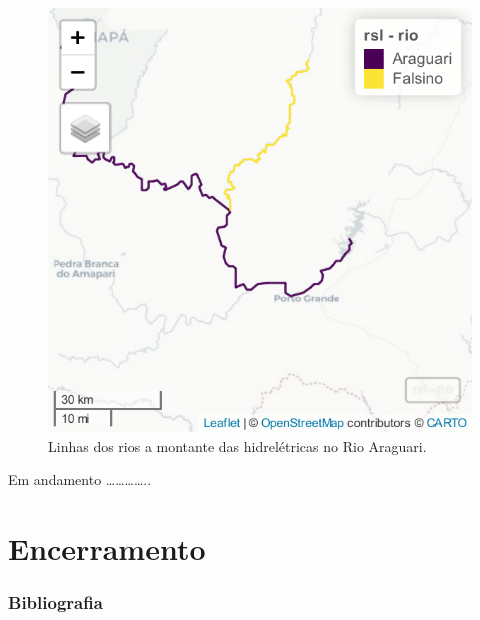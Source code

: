 \documentclass[
]{article}
\begin{document}
\begin{figure}
\centering
\includegraphics{epr_files/figure-latex/unnamed-chunk-258-1.pdf}
\caption{\label{fig:unnamed-chunk-258}Linhas dos rios a montante das hidrelétricas no Rio Araguari.}
\end{figure}

Em andamento \ldots\ldots\ldots\ldots..

\newpage{}

\newpage{}

\hypertarget{part-encerramento}{%
\part{Encerramento}\label{part-encerramento}}

\newpage{}

\hypertarget{bibliografia}{%
\section*{Bibliografia}\label{bibliografia}}
\end{document}

